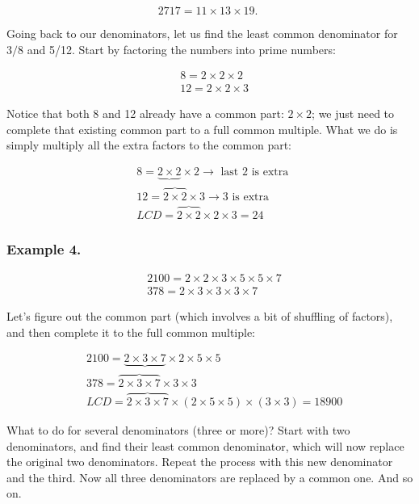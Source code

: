 \documentclass{ximera}
\begin{document}
$$2717=11 \times 13 \times 19 \text {. }$$

Going back to our denominators, let us find the least common denominator for $3 / 8$ and 5/12. Start by factoring the numbers into prime numbers:

$$\begin{aligned}
& 8=2 \times 2 \times 2 \\
& 12=2 \times 2 \times 3
\end{aligned}$$

Notice that both 8 and 12 already have a common part: $2 \times 2$; we just need to complete that existing common part to a full common multiple. What we do is simply multiply all the extra factors to the common part:

$$\begin{aligned}
& 8=\underbrace{2 \times 2} \times 2 \rightarrow \text { last } 2 \text { is extra } \\
& 12=\overbrace{2 \times 2} \times 3 \rightarrow 3 \text { is extra } \\
& L C D=\overbrace{2 \times 2} \times 2 \times 3=24
\end{aligned}$$

\subsubsection*{Example 4.}
$$\begin{aligned}
& 2100=2 \times 2 \times 3 \times 5 \times 5 \times 7 \\
& 378=2 \times 3 \times 3 \times 3 \times 7
\end{aligned}$$

Let's figure out the common part (which involves a bit of shuffling of factors), and then complete it to the full common multiple:

$$\begin{aligned}
& 2100=\underbrace{2 \times 3 \times 7} \times 2 \times 5 \times 5 \\
& 378=\overbrace{2 \times 3 \times 7} \times 3 \times 3 \\
& L C D=\overbrace{2 \times 3 \times 7} \times(2 \times 5 \times 5) \times(3 \times 3)=18900
\end{aligned}$$

What to do for several denominators (three or more)? Start with two denominators, and find their least common denominator, which will now replace the original two denominators. Repeat the process with this new denominator and the third. Now all three denominators are replaced by a common one. And so on.
\end{document}

